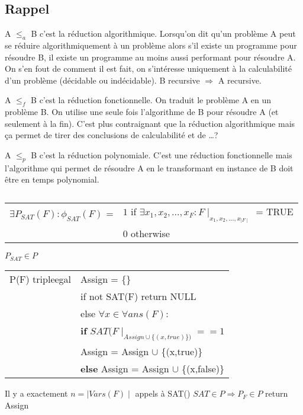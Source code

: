 \subsection*{Rappel}

A $\leq_{a}$ B c'est la réduction algorithmique. Lorsqu'on dit qu'un
problème A peut se réduire algorithmiquement à un problème alors s'il
existe un programme pour résoudre B, il existe un programme au moins
aussi performant pour résoudre A. On s'en fout de comment il est fait,
on s'intéresse uniquement à la calculabilité d'un problème (décidable ou
indécidable). B recursive $\Rightarrow$ A recursive.

A $\leq_{f}$ B c'est la réduction fonctionnelle. On traduit le problème
A en un problème B. On utilise une seule fois l'algorithme de B pour
résoudre A (et seulement à la fin). C'est plus contraignant que la
réduction algorithmique mais ça permet de tirer des conclusions de
calculabilité et de \dots ?

A $\leq_{p}$ B c'est la réduction polynomiale. C'est une réduction
fonctionnelle mais l'algorithme qui permet de résoudre A en le
transformant en instance de B doit être en temps polynomial.

\subsection{}

\begin{tabular}{ll}
    $\exists P_{SAT}(F) : \phi_{SAT} (F)$ = & $1$ if $\exists x_{1}, x_{2},\dots, x_{F} : F \mid_{x_{1}, x_{2},\dots, x_{\mid F\mid}}$ = TRUE \\
    & 0 otherwise
\end{tabular}

$P_{SAT} \in P$ 

\begin{tabular}{ll}
    P(F) tripleegal & Assign = \{\} \\
    & if not SAT(F) return NULL\\
    & else $\forall x \in \forall ans(F) :$\\
    & \textbf{if} $SAT(F \mid_{Assign \cup \{(x, true)\})} == 1$ \\
    & Assign = Assign $\cup$ \{(x,true)\} \\
    & \textbf{else} Assign = Assign $\cup$ \{(x,false)\}
\end{tabular}

Il y a exactement $n = \mid Vars(F)\mid$ appels à SAT()
$SAT \in P \Rightarrow P_{F} \in P$ return Assign


